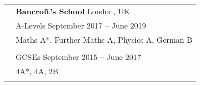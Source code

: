 \documentclass[letterpaper, 11pt]{article}
\begin{document}
\begin{longtable}{p{1.3in}p{4.8in}}
     & \textbf{Bancroft's School} \hfill London, UK                                                                                                                                                                       \\
     & A-Levels \hfill September 2017 -- June 2019                                                                                                                                                                        \\
     & Maths A*. Further Maths A, Physics A, German B                                                                                                                                                                     \\
     &                                                                                                                                                                                                                    \\
     & GCSEs \hfill September 2015 -- June 2017                                                                                                                                                                           \\
     & 4A*, 4A, 2B                                                                                                                                                                                                        \\
     &                                                                                                                                                                                                                    \\




\end{longtable}
\end{document}
